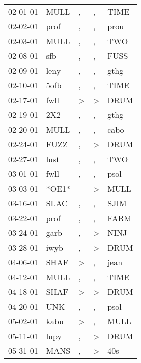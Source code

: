 \begin{supertabular}{lllll}
 02-01-01 &   MULL &                , &                , &   TIME \\
 02-02-01 &   prof &                , &                , &   prou \\
 02-03-01 &   MULL &                , &                , &    TWO \\
 02-08-01 &    sfb &                , &                , &   FUSS \\
 02-09-01 &   leny &                , &                , &   gthg \\
 02-10-01 &   5ofb &                , &                , &   TIME \\
 02-17-01 &   fwll &     \textgreater &     \textgreater &   DRUM \\
 02-19-01 &    2X2 &                , &                , &   gthg \\
 02-20-01 &   MULL &                , &                , &   cabo \\
 02-24-01 &   FUZZ &                , &     \textgreater &   DRUM \\
 02-27-01 &   lust &                , &                , &    TWO \\
 03-01-01 &   fwll &                , &                , &   psol \\
 03-03-01 &  *OE1* &                  &     \textgreater &   MULL \\
 03-16-01 &   SLAC &                , &                , &   SJIM \\
 03-22-01 &   prof &                , &                , &   FARM \\
 03-24-01 &   garb &                , &     \textgreater &   NINJ \\
 03-28-01 &   iwyb &                , &     \textgreater &   DRUM \\
 04-06-01 &   SHAF &     \textgreater &                , &   jean \\
 04-12-01 &   MULL &                , &                , &   TIME \\
 04-18-01 &   SHAF &     \textgreater &     \textgreater &   DRUM \\
 04-20-01 &    UNK &                , &                , &   psol \\
 05-02-01 &   kabu &     \textgreater &                , &   MULL \\
 05-11-01 &   lupy &                , &     \textgreater &   DRUM \\
 05-31-01 &   MANS &                , &     \textgreater &    40s \\

\end{supertabular}
